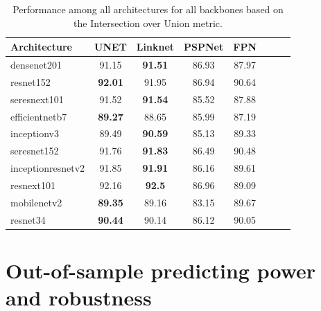 \begin{table}[H]
    \centering
    \caption[Model performance comparison]{Performance among all architectures
        for all backbones based on
        the Intersection over Union metric.}
    \label{tab:metrics-architectures}
    \begin{tabular}{lccccccc}
        \toprule
        \textbf{Architecture} & \textbf{UNET}  & \textbf{Linknet} &
        \textbf{PSPNet}       &
        \textbf{FPN}
        \\
        \midrule
        densenet201           & 91.15          & \textbf{91.51}   & 86.93
                              & 87.97
        \\
        resnet152             & \textbf{92.01} & 91.95            & 86.94
                              & 90.64
        \\
        seresnext101          & 91.52          & \textbf{91.54}   & 85.52
                              & 87.88
        \\
        efficientnetb7        & \textbf{89.27} & 88.65            & 85.99
                              & 87.19
        \\
        inceptionv3           & 89.49          & \textbf{90.59}   & 85.13
                              & 89.33
        \\
        seresnet152           & 91.76          & \textbf{91.83}   & 86.49
                              & 90.48
        \\
        inceptionresnetv2     & 91.85          & \textbf{91.91}   & 86.16
                              & 89.61
        \\
        resnext101            & 92.16          & \textbf{92.5}    & 86.96
                              & 89.09
        \\
        mobilenetv2           & \textbf{89.35} & 89.16            & 83.15
                              & 89.67
        \\
        resnet34              & \textbf{90.44} & 90.14            & 86.12
                              & 90.05
        \\
        \bottomrule
    \end{tabular}
\end{table}

\section{Out-of-sample predicting power and
  robustness}\label{app:out_of_sample}


